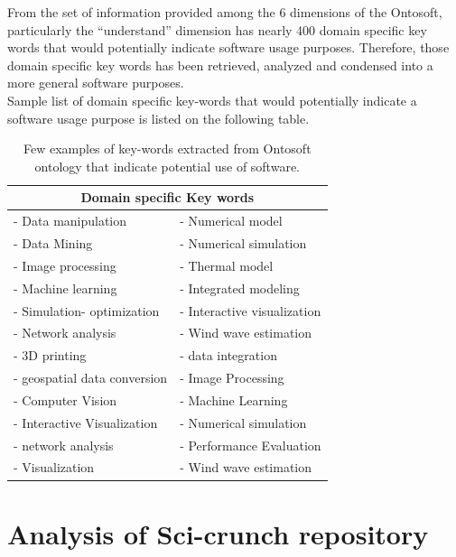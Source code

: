 From the set of information provided among the 6 dimensions of the Ontosoft, particularly the “understand” dimension has nearly 400 domain specific key words that would potentially indicate software usage purposes. Therefore, those domain specific key words has been retrieved, analyzed and condensed into a more general software purposes. \\

Sample list of domain specific key-words that would potentially indicate a software usage purpose is listed on the following table. 

\begin{table}[h!]
	\begin{center}
		\caption{Few examples of key-words extracted from Ontosoft ontology that indicate potential use of software.}
		\label{tab:table1}
		\begin{tabular}{|l|l|} %
			
			\hline
			\multicolumn{2}{|c|}{Domain specific Key words }\\
			\hline
			-	Data manipulation & -	Numerical model \\
			-	Data Mining       & -	Numerical simulation \\
			-	Image processing  & -   Thermal model \\
			-	Machine learning  & -   Integrated modeling \\
			-	Simulation- optimization & - Interactive visualization \\
			-	Network analysis & - Wind wave estimation \\
			- 3D printing         & - data integration \\
			- geospatial data conversion & - Image Processing \\
			- Computer Vision & - Machine Learning \\
			- Interactive Visualization & - Numerical simulation \\
			- network analysis & - Performance Evaluation \\
			- Visualization & -  Wind wave estimation \\
			\hline
		\end{tabular}
	\end{center}
\end{table}

\section{Analysis of Sci-crunch repository }
\label{sec:purpose:Sci}

